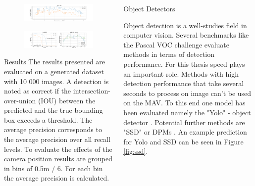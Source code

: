 \documentclass{beamer}
\begin{document}
\begin{frame}[fragile]
\begin{columns}[T]
\begin{column}{.45\textwidth}
\begin{figure}
	\includegraphics[width=\textwidth]{fig/meanAP-eucl}
	
	\label{fig:meanAP-eucl}
\end{figure}
\begin{figure}
	\centering
	\includegraphics[width=\textwidth]{fig/angle-pr}
	
	\label{fig:angl-pr}
\end{figure}

	\begin{block}{Results}
		The results presented are evaluated on a generated dataset with 10 000 images. A detection is noted as correct if the intersection-over-union (IOU) between the predicted and the true bounding box exceeds a threshold. The average precision corresponds to the average precision over all recall levels. To evaluate the effects of the camera position results are grouped in bins of 0.5m / 6\degree. For each bin the average precision is calculated.
	\end{block}






\end{column}
\begin{column}{.25\textwidth}
	\begin{block}{Object Detectors}
		
		Object detection is a well-studies field in computer vision. Several benchmarks like the Pascal VOC challenge evaluate methods in terms of detection performance. For this thesis speed plays an important role. Methods with high detection performance that take several seconds to process on image can't be used on the MAV. To this end one model has been evaluated namely the "Yolo" - object detector \cite{Redmon}. Potential further methods are "SSD"\cite{Liu} or DPMs \cite{felzenszwalb2008discriminatively}. An example prediction for Yolo and SSD can be seen in Figure \ref{fig:ssd}.
		

\end{block}
\end{column}
\end{columns}
\end{frame}
\end{document}
